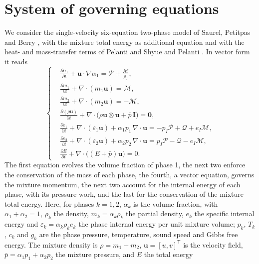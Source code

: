 \documentclass[a4paper,fleqn]{cas-sc}
\begin{document}
\section{System of governing equations}
\label{sec:governing}
We consider the single-velocity six-equation two-phase model of Saurel, Petitpas and Berry \cite{SPB2009}, with the
mixture total energy as additional equation and with the heat- and mass-transfer terms of Pelanti and Shyue
\cite{PelantiShyue2014} and Pelanti \cite{Pelanti2022}. In vector form it reads
\begin{equation}
\left\{
\begin{aligned}
&\frac{\partial\alpha_1}{\partial t}+\mathbf u\cdot\nabla\alpha_1=\mathcal P+\frac{\mathcal M}{\rho_I},\\
&\frac{\partial m_1}{\partial t}+\nabla\cdot(m_1\mathbf u)=\mathcal M,\\
&\frac{\partial m_2}{\partial t}+\nabla\cdot(m_2\mathbf u)=-\mathcal M,\\
&\frac{\partial(\rho\mathbf u)}{\partial t}+\nabla\cdot\big(\rho\mathbf u\otimes\mathbf u+\bar p\,\mathbf I\big)=\mathbf 0,\\
&\frac{\partial\varepsilon_1}{\partial t}+\nabla\cdot(\varepsilon_1\mathbf u)+\alpha_1p_1\,\nabla\cdot\mathbf u=-p_I\mathcal P+\mathcal Q+e_I\mathcal M,\\
&\frac{\partial\varepsilon_2}{\partial t}+\nabla\cdot(\varepsilon_2\mathbf u)+\alpha_2p_2\,\nabla\cdot\mathbf u=p_I\mathcal P-\mathcal Q-e_I\mathcal M,\\
&\frac{\partial E}{\partial t}+\nabla\cdot\big((E+\bar p)\mathbf u\big)=0 .
\end{aligned}\right.
\label{eq:model}
\end{equation}
The first equation evolves the volume fraction of phase 1, the next two enforce the conservation of the mass of each
phase, the fourth, a vector equation, governs the mixture momentum, the next two account for the
internal energy of each phase, with its pressure work, and the last for the conservation of the mixture total energy.
Here, for phases $k=1,2$, $\alpha_k$ is the volume fraction, with $\alpha_1+\alpha_2=1$, $\rho_k$ the density, $m_k=\alpha_k\rho_k$ the partial
density, $e_k$ the specific internal energy and $\varepsilon_k=\alpha_k\rho_ke_k$ the phase internal energy per unit mixture volume;
$p_k$, $T_k$, $c_k$ and $g_k$ are the phase pressure, temperature, sound speed and Gibbs free energy. The mixture density is
$\rho=m_1+m_2$, $\mathbf u=[u,v]^{\mathsf T}$ is the velocity field, $\bar p=\alpha_1p_1+\alpha_2p_2$ the mixture pressure, and $E$ the total energy
\end{document}

